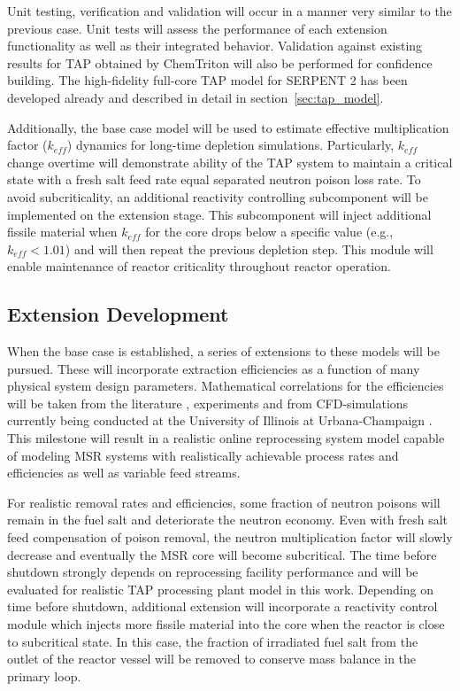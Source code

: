 Unit testing, verification and validation will occur in a manner 
very similar to the previous case. Unit tests will assess the 
performance of each extension functionality as well as their 
integrated behavior. Validation against existing results for 
\gls{TAP} obtained by ChemTriton \cite{betzler_two-dimensional_2017, 
betzler_molten_2017} will also be performed for confidence 
building. The high-fidelity full-core \gls{TAP} model for 
SERPENT 2 has been developed already and described in detail 
in section~\ref{sec:tap_model}.

Additionally, the base case model will be used to estimate effective 
multiplication factor ($k_{eff}$) dynamics for long-time 
depletion simulations. Particularly, $k_{eff}$ change overtime 
will demonstrate 
ability of the \gls{TAP} system to maintain a critical state with a
fresh salt feed rate equal separated neutron poison loss rate. 
To avoid subcriticality, an additional reactivity 
controlling subcomponent will be implemented on the extension stage. 
This subcomponent 
will inject additional fissile material 
when $k_{eff}$ for the core drops below a specific value (e.g., 
$k_{eff}<1.01$) and will then repeat the previous depletion step. 
This module will enable maintenance of reactor criticality 
throughout reactor operation.
 
\subsection{Extension Development}
When the base case is established, a series of extensions to 
these models will be pursued. These will incorporate extraction 
efficiencies as a function of many physical system design 
parameters. Mathematical correlations for the efficiencies will 
be taken from the literature \cite{gabbard_development_1974}, 
experiments and from CFD-simulations currently being conducted at 
the University of Illinois at Urbana-Champaign \cite{huff_enabling_2018}.
This milestone will result in a realistic online reprocessing system 
model capable of modeling \gls{MSR} systems with realistically achievable 
process rates and efficiencies as well as variable feed streams. 

For realistic removal rates and efficiencies, some fraction of neutron 
poisons will remain in the fuel salt and deteriorate the neutron 
economy. Even with fresh salt feed compensation of poison removal, 
the neutron multiplication factor will slowly decrease and 
eventually the \gls{MSR} core will become subcritical. The time before 
shutdown strongly depends on reprocessing facility performance 
and will be evaluated for realistic \gls{TAP} processing plant model 
in this work. Depending on time before shutdown, additional 
extension will 
incorporate a reactivity control module which injects more fissile 
material into the core when the reactor is close to subcritical state. 
In this case, the fraction of irradiated fuel salt from the outlet of 
the reactor vessel will be removed to conserve mass balance in the 
primary loop.

